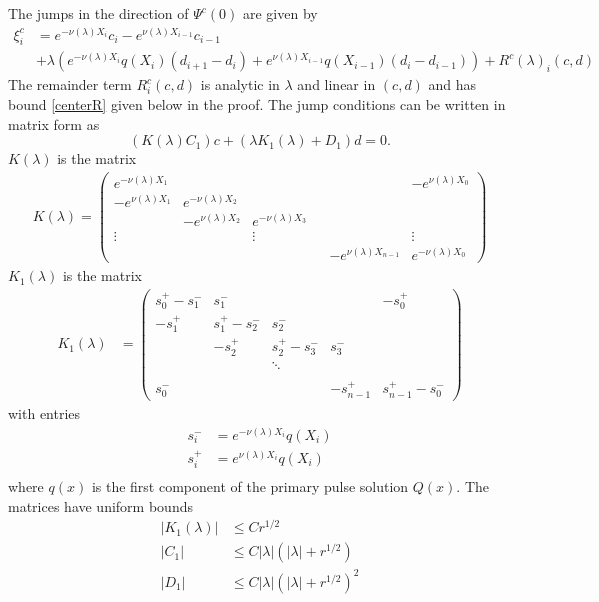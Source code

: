 \documentclass[thesis.tex]{subfiles}
\begin{document}
\begin{lemma}\label{jumpcenteradj}
The jumps in the direction of $\Psi^c(0)$ are given by
\begin{equation}\label{xic}
\begin{aligned}
\xi^c_i &= e^{-\nu(\lambda) X_i} c_i - e^{\nu(\lambda) X_{i-1}} c_{i-1} \\
&+ \lambda \left( e^{-\nu(\lambda)X_i} q(X_i) (d_{i+1} - d_i ) + e^{\nu(\lambda)X_{i-1}} q(X_{i-1}) (d_i - d_{i-1} )\right)  + R^c(\lambda)_i(c, d)
\end{aligned}
\end{equation}
The remainder term $R^c_i(c, d)$ is analytic in $\lambda$ and linear in $(c, d)$ and has bound \cref{centerR} given below in the proof. The jump conditions can be written in matrix form as
\begin{equation}\label{matrixjumpc}
(K(\lambda) C_1) c + (\lambda K_1(\lambda) + D_1) d = 0.
\end{equation}
$K(\lambda)$ is the matrix
\begin{align*}
K(\lambda) =  
\begin{pmatrix}
e^{-\nu(\lambda)X_1} & & & & & -e^{\nu(\lambda)X_0} \\
-e^{\nu(\lambda)X_1} & e^{-\nu(\lambda)X_2} \\
& -e^{\nu(\lambda)X_2} & e^{-\nu(\lambda)X_3} \\
\vdots & & \vdots & &&  \vdots \\
& & & & -e^{\nu(\lambda)X_{n-1}} & e^{-\nu(\lambda)X_0}
\end{pmatrix}
\end{align*}
$K_1(\lambda)$ is the matrix
\begin{align*}
K_1(\lambda) &= \begin{pmatrix}
s_0^+ - s_1^- & s_1^- &&& -s_0^+ \\
-s_1^+ & s_1^+ - s_2^- & s_2^- \\
& -s_2^+ & s_2^+ - s_3^- & s_3^- \\ && \ddots \\
\\
s_0^- &&& -s_{n-1}^+ & s_{n-1}^+ - s_0^- 
\end{pmatrix}
\end{align*}
with entries
\begin{align*}
s_i^- &= e^{-\nu(\lambda)X_i} q(X_i)\\
s_i^+ &= e^{\nu(\lambda)X_i} q(X_i)\\
\end{align*}
where $q(x)$ is the first component of the primary pulse solution $Q(x)$. The matrices have uniform bounds
\begin{align}\label{centerjumprem}
|K_1(\lambda)| &\leq C r^{1/2} \\
|C_1| &\leq C |\lambda|(|\lambda| + r^{1/2}) \\
|D_1| &\leq C |\lambda|(|\lambda| + r^{1/2})^2
\end{align}


\end{lemma}
\end{document}
